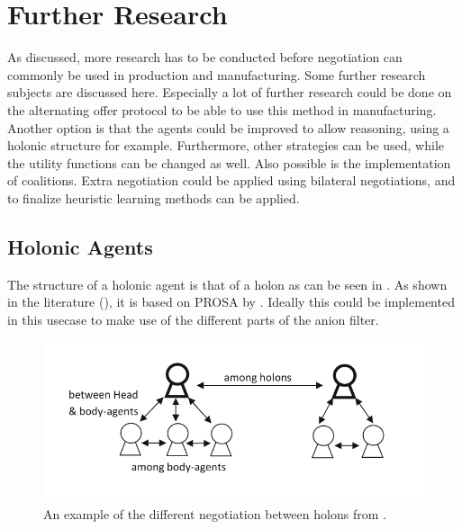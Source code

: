 \section{Further Research}
As discussed, more research has to be conducted before negotiation can commonly be used in production and manufacturing. Some further research subjects are discussed here. Especially a lot of further research could be done on the alternating offer protocol to be able to use this method in manufacturing. Another option is that the agents could be improved to allow reasoning, using a holonic structure for example. Furthermore, other strategies can be used, while the utility functions can be changed as well. Also possible is the implementation of coalitions. Extra negotiation could be applied using bilateral negotiations, and to finalize heuristic learning methods can be applied.

\subsection{Holonic Agents}

The structure of a holonic agent is that of a holon as can be seen in . As shown in the literature (), it is based on PROSA by \citep{van1998reference}. Ideally this could be implemented in this usecase to make use of the different parts of the anion filter.
\begin{figure}[h]
	\centering
	\includegraphics[width=0.7\linewidth]{img/holon_example}
	\caption{An example of the different negotiation between holons from \citet{beheshti2016negotiations}.}
	\label{fig:holonexample}
\end{figure}

